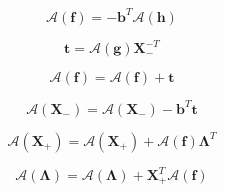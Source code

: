 \begin{equation}
\mathcal{A}(\mathbf{f}) = -\mathbf{b}^{T} \mathcal{A}(\mathbf{h})
\label{eq:global_r_and_t_from_eigenvalues_matrix-adjoint_of_tangent_linear-f_a}
\end{equation}

\begin{equation}
\mathbf{t} = \mathcal{A}(\mathbf{g})\mathbf{X}^{-T}_{-}
\label{eq:global_r_and_t_from_eigenvalues_matrix-adjoint_of_tangent_linear-t_a3}
\end{equation}

\begin{equation}
\mathcal{A}(\mathbf{f}) = \mathcal{A}(\mathbf{f}) + \mathbf{t}
\label{eq:global_r_and_t_from_eigenvalues_matrix-adjoint_of_tangent_linear-f_a2}
\end{equation}

\begin{equation}
\mathcal{A}(\mathbf{X}_{-}) = \mathcal{A}(\mathbf{X}_{-}) - \mathbf{b}^{T}\mathbf{t}
\label{eq:global_r_and_t_from_eigenvalues_matrix-adjoint_of_tangent_linear-X_m_a3}
\end{equation}

\begin{equation}
\mathcal{A}(\mathbf{X}_{+}) = \mathcal{A}(\mathbf{X}_{+}) + \mathcal{A}(\mathbf{f})\mathbf{\Lambda}^{T}
\label{eq:global_r_and_t_from_eigenvalues_matrix-adjoint_of_tangent_linear-X_p_a2}
\end{equation}

\begin{equation}
\mathcal{A}(\mathbf{\Lambda}) = \mathcal{A}(\mathbf{\Lambda}) + \mathbf{X}^{T}_{+}\mathcal{A}(\mathbf{f})
\label{eq:global_r_and_t_from_eigenvalues_matrix-adjoint_of_tangent_linear-lambda_a2}
\end{equation}

